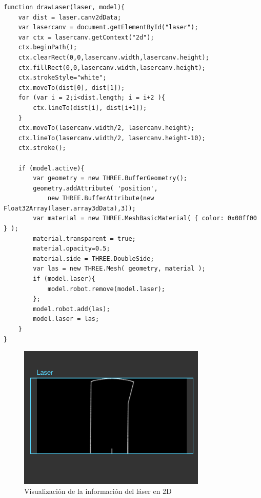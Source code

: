 \begin{lstlisting}[caption= Método para bibujar el escaneo del sensor láser, label=cod.dibujarlaser]
function drawLaser(laser, model){
	var dist = laser.canv2dData;
	var lasercanv = document.getElementById("laser");
	var ctx = lasercanv.getContext("2d");
	ctx.beginPath();
	ctx.clearRect(0,0,lasercanv.width,lasercanv.height);
	ctx.fillRect(0,0,lasercanv.width,lasercanv.height);
	ctx.strokeStyle="white";
	ctx.moveTo(dist[0], dist[1]);
	for (var i = 2;i<dist.length; i = i+2 ){
		ctx.lineTo(dist[i], dist[i+1]);
	}
	ctx.moveTo(lasercanv.width/2, lasercanv.height);
	ctx.lineTo(lasercanv.width/2, lasercanv.height-10);
	ctx.stroke();
	
	if (model.active){
		var geometry = new THREE.BufferGeometry();
		geometry.addAttribute( 'position', 
			new THREE.BufferAttribute(new Float32Array(laser.array3dData),3));
		var material = new THREE.MeshBasicMaterial( { color: 0x00ff00 } );
		material.transparent = true;
		material.opacity=0.5;
		material.side = THREE.DoubleSide;
		var las = new THREE.Mesh( geometry, material );
		if (model.laser){
			model.robot.remove(model.laser);
		};
		model.robot.add(las);
		model.laser = las;
	}
}
\end{lstlisting}

\begin{figure}[H]
  \begin{center}
    \includegraphics[width=0.8\textwidth]{figures/laser2dturtle.png}
		\caption{Visualización de la información del láser en 2D}
		\label{fig.laser2dturtle}
		\end{center}
\end{figure}

